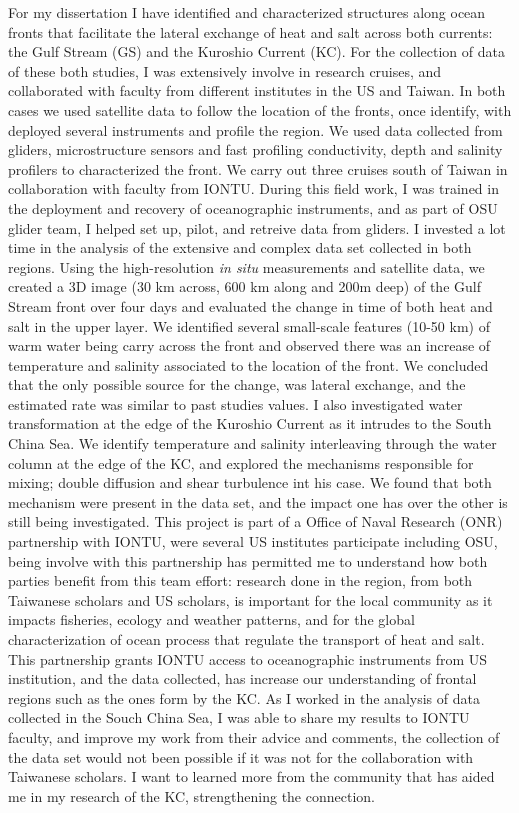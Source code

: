 \documentclass[letterpaper, 12pt ]{article}
\begin{document}
    For my dissertation I have identified and characterized structures along ocean fronts that facilitate the lateral exchange of heat and salt across both currents: the Gulf Stream (GS) and the Kuroshio Current (KC). For the collection of data of these both studies, I was extensively involve in research cruises, and collaborated with faculty from different institutes in the US and Taiwan. In both cases we used satellite data to follow the location of the fronts, once identify, with deployed several instruments and profile the region. We used data collected from gliders, microstructure sensors and fast profiling conductivity, depth and salinity profilers to characterized the front. We carry out three cruises south of Taiwan in collaboration with faculty from IONTU. During this field work, I was trained in the deployment and recovery of oceanographic instruments, and as part of OSU glider team, I helped set up, pilot, and retreive data from gliders. 
    \vspace{10pt}
    I invested a lot time in the analysis of the extensive and complex data set collected in both regions. Using the high-resolution \textit{in situ} measurements and satellite data, we created a 3D image (30 km across, 600 km along and 200m deep) of the Gulf Stream front over four days and evaluated the change in time of both heat and salt in the upper layer. We identified several small-scale features (10-50 km) of warm water being carry across the front and observed there was an increase of temperature and salinity associated to the location of the front. We concluded that the only possible source for the change, was lateral exchange, and the estimated rate was similar to past studies values. I also investigated  water transformation at the edge of the Kuroshio Current as it intrudes to the South China Sea. We identify temperature and salinity interleaving through the water column at the edge of the KC, and explored the mechanisms responsible for mixing; double diffusion and shear turbulence int his case. We found that both mechanism were present in the data set, and the impact one has over the other is still being investigated. This project is part of a Office of Naval Research (ONR) partnership with IONTU, were several US institutes participate including OSU, being involve with this partnership has permitted me to understand how both parties benefit from this team effort: research done in the region, from both Taiwanese scholars and US scholars, is important for the local community as it impacts fisheries, ecology and weather patterns, and for the global characterization of ocean process that regulate the transport of heat and salt. This partnership grants IONTU access to oceanographic instruments from US institution, and the data collected, has increase our understanding of frontal regions such as the ones form by the KC. As I worked in the analysis of data collected in the Souch China Sea, I was able to share my results to IONTU faculty, and improve my work from their advice and comments, the collection of the data set would not been possible if it was not for the collaboration with Taiwanese scholars. I want to learned more from the community that has aided me in my research of the KC, strengthening the connection.
    
\end{document}
